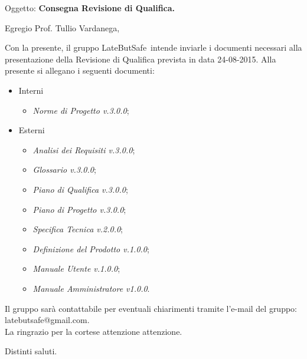 \documentclass{letter}
\makeatletter
\newcommand{\DefinizioneDelProdotto}{\textit{Definizione del Prodotto v.1.0.0}}
\newcommand{\SpecificaTecnica}{\textit{Specifica Tecnica v.2.0.0}}
\newcommand{\AnalisiDeiRequisiti}{\textit{Analisi dei Requisiti v.3.0.0}}
\newcommand{\PianoDiProgetto}{\textit{Piano di Progetto v.3.0.0}}
\newcommand{\NormeDiProgetto}{\textit{Norme di Progetto v.3.0.0}}
\newcommand{\PianoDiQualifica}{\textit{Piano di Qualifica v.3.0.0}}
\newcommand{\ManualeUtente}{\textit{Manuale Utente v.1.0.0}}
\newcommand{\ManualeAmministratore}{\textit{Manuale Amministratore v1.0.0}}
\newcommand{\Glossario}{\textit{Glossario v.3.0.0}}
\newcommand{\gruppo}{LateButSafe}
\newcommand{\mail}{latebutsafe@gmail.com}
\newcommand{\Vardanega}{Prof. Tullio Vardanega}
\makeatother
\begin{document}
	
	\begin{letter}{Oggetto: \textbf{Consegna Revisione di Qualifica.}}
	\opening {Egregio \Vardanega ,}
	Con la presente, il gruppo \gruppo\ intende inviarle i documenti necessari alla presentazione della Revisione di Qualifica prevista in data 24-08-2015.
	Alla presente si allegano i seguenti documenti:
			\begin{itemize}
				\item Interni
					\begin{itemize}
						\item \NormeDiProgetto;
					\end{itemize}
				\item Esterni
					\begin{itemize}
						\item \AnalisiDeiRequisiti;
						\item \Glossario;
						\item \PianoDiQualifica;
						\item \PianoDiProgetto;
						\item \SpecificaTecnica;
						\item \DefinizioneDelProdotto;
						\item \ManualeUtente;
						\item \ManualeAmministratore.
					\end{itemize}
			\end{itemize} 
		Il gruppo sarà  contattabile per eventuali chiarimenti tramite l'e-mail del gruppo: \mail.	\\
		La ringrazio per la cortese attenzione attenzione.
		
		\thispagestyle{fancy}
		\closing{Distinti saluti.}
		\signature{Manuel Fossa\\
					Responsabile di Progetto\\
					\gruppo}
   \end{letter}
\end{document}
